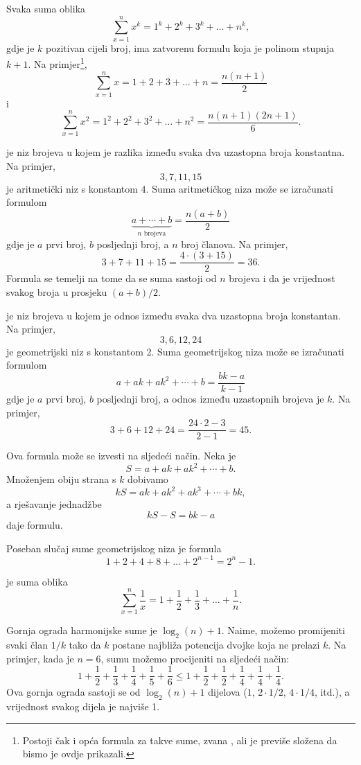 Svaka suma oblika
\[\sum_{x=1}^n x^k = 1^k+2^k+3^k+\ldots+n^k,\]
gdje je $k$ pozitivan cijeli broj,
ima zatvorenu formulu koja je
polinom stupnja $k+1$.
Na primjer\footnote{
Postoji čak i opća formula za takve sume, zvana ,
ali je previše složena da bismo je ovdje prikazali.},
\[\sum_{x=1}^n x = 1+2+3+\ldots+n = \frac{n(n+1)}{2}\]
i
\[\sum_{x=1}^n x^2 = 1^2+2^2+3^2+\ldots+n^2 = \frac{n(n+1)(2n+1)}{6}.\]

 je 
niz brojeva
u kojem je razlika između svaka dva uzastopna
broja konstantna.
Na primjer,
\[3, 7, 11, 15\]
je aritmetički niz s konstantom 4.
Suma aritmetičkog niza može se izračunati
formulom
\[\underbrace{a + \cdots + b}_{n \,\, \textrm{brojeva}} = \frac{n(a+b)}{2}\]
gdje je $a$ prvi broj,
$b$ posljednji broj, a
$n$ broj članova.
Na primjer,
\[3+7+11+15=\frac{4 \cdot (3+15)}{2} = 36.\]
Formula se temelji na tome
da se suma sastoji od $n$ brojeva i
da je vrijednost svakog broja u prosjeku $(a+b)/2$.

 je niz
brojeva
u kojem je odnos između svaka dva uzastopna
broja konstantan.
Na primjer,
\[3,6,12,24\]
je geometrijski niz s konstantom 2.
Suma geometrijskog niza može se izračunati
formulom
\[a + ak + ak^2 + \cdots + b = \frac{bk-a}{k-1}\]
gdje je $a$ prvi broj,
$b$ posljednji broj, a
odnos između uzastopnih brojeva je $k$.
Na primjer,
\[3+6+12+24=\frac{24 \cdot 2 - 3}{2-1} = 45.\]

Ova formula može se izvesti na sljedeći način. Neka je
\[ S = a + ak + ak^2 + \cdots + b .\]
Množenjem obiju strana s $k$ dobivamo
\[ kS = ak + ak^2 + ak^3 + \cdots + bk,\]
a rješavanje jednadžbe
\[ kS-S = bk-a\]
daje formulu.

Poseban slučaj sume geometrijskog niza je formula
\[1+2+4+8+\ldots+2^{n-1}=2^n-1.\]


 je suma oblika
\[ \sum_{x=1}^n \frac{1}{x} = 1+\frac{1}{2}+\frac{1}{3}+\ldots+\frac{1}{n}.\]

Gornja ograda harmonijske sume je $\log_2(n)+1$.
Naime, možemo
promijeniti svaki član $1/k$ tako da $k$ postane
najbliža potencija dvojke koja ne prelazi $k$.
Na primjer, kada je $n=6$, sumu možemo
procijeniti na sljedeći način:
\[ 1+\frac{1}{2}+\frac{1}{3}+\frac{1}{4}+\frac{1}{5}+\frac{1}{6} \le
1+\frac{1}{2}+\frac{1}{2}+\frac{1}{4}+\frac{1}{4}+\frac{1}{4}.\]
Ova gornja ograda sastoji se od $\log_2(n)+1$ dijelova
($1$, $2 \cdot 1/2$, $4 \cdot 1/4$, itd.),
a vrijednost svakog dijela je najviše 1.

